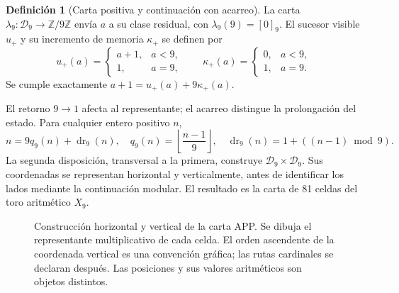 \documentclass[11pt,a4paper]{article}
\numberwithin{equation}{section}
\theoremstyle{definition}
\newtheorem{definition}[theorem]{Definición}
\newcommand{\Z}{\mathbb Z}
\begin{document}
\begin{definition}[Carta positiva y continuación con acarreo]
La carta $\lambda_9:\mathcal D_9\to\Z/9\Z$ envía $a$ a su clase
residual, con $\lambda_9(9)=[0]_9$. El sucesor visible $u_+$ y su
incremento de memoria $\kappa_+$ se definen por
\[
u_+(a)=\begin{cases}a+1,&a<9,\\1,&a=9,\end{cases}
\qquad
\kappa_+(a)=\begin{cases}0,&a<9,\\1,&a=9.\end{cases}
\]
Se cumple exactamente $a+1=u_+(a)+9\kappa_+(a)$.
\end{definition}
El retorno $9\to1$ afecta al representante; el acarreo distingue
la prolongación del estado. Para cualquier entero positivo $n$,
\[
n=9q_9(n)+\operatorname{dr}_9(n),\quad
q_9(n)=\left\lfloor\frac{n-1}{9}\right\rfloor,\quad
\operatorname{dr}_9(n)=1+((n-1)\bmod9).
\]
La segunda disposición, transversal a la primera, construye
$\mathcal D_9\times\mathcal D_9$. Sus coordenadas se representan
horizontal y verticalmente, antes de identificar los lados mediante
la continuación modular. El resultado es la carta de 81 celdas
del toro aritmético $X_9$.

\begin{figure}[htbp]
\centering
{}
\caption{Construcción horizontal y vertical de la carta APP. Se dibuja el
representante multiplicativo de cada celda. El orden ascendente de la
coordenada vertical es una convención gráfica; las rutas cardinales se
declaran después. Las posiciones y sus valores aritméticos son objetos distintos.}
\label{fig:app-construction}
\end{figure}
\end{document}
